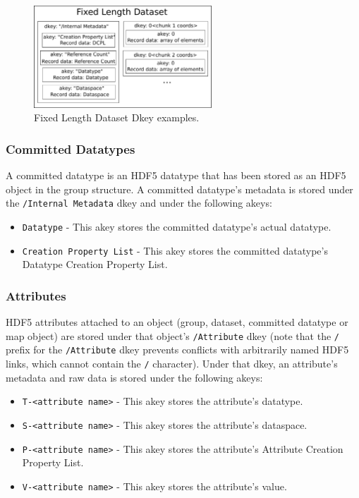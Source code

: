 \begin{figure}
\includegraphics[width=0.6\textwidth]{pics/dataset_figure}
\caption{Fixed Length Dataset Dkey examples.}
\label{fig:dataset}
\end{figure}

\newpage

\subsubsection{Committed Datatypes}

A committed datatype is an HDF5 datatype that has been stored as an HDF5 object in the group structure. A committed datatype's metadata is stored under the \verb+/Internal Metadata+ dkey and under the following akeys:

\begin{itemize}
    \item \verb+Datatype+ - This akey stores the committed datatype's actual datatype.
    \item \verb+Creation Property List+ - This akey stores the committed datatype's Datatype Creation Property List.
\end{itemize}


\newpage

\subsubsection{Attributes}

HDF5 attributes attached to an object (group, dataset, committed datatype or map object) are stored under that object's \verb+/Attribute+ dkey (note that the \verb+/+ prefix for the \verb+/Attribute+ dkey prevents conflicts with arbitrarily named HDF5 links, which cannot contain the \verb+/+ character). Under that dkey, an attribute's metadata and raw data is stored under the following akeys:

\begin{itemize}
    \item \verb+T-<attribute name>+ - This akey stores the attribute's datatype.
    \item \verb+S-<attribute name>+ - This akey stores the attribute's dataspace.
    \item \verb+P-<attribute name>+ - This akey stores the attribute's Attribute Creation Property List.
    \item \verb+V-<attribute name>+ - This akey stores the attribute's value.
\end{itemize}

